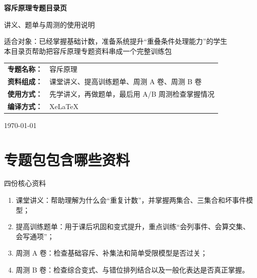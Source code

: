 \documentclass[11pt,a4paper,fontset=fandol]{ctexart}
\begin{document}
\thispagestyle{empty}
\begin{titlepage}
\centering
\vspace*{0.9cm}

\begin{tcolorbox}[
  enhanced,
  width=0.92\textwidth,
  colback=white,
  colframe=mainblue,
  boxrule=1pt,
  arc=0mm,
  left=6mm,
  right=6mm,
  top=8mm,
  bottom=8mm
]
\centering

{\fontsize{24}{30}\selectfont\bfseries 容斥原理专题目录页\par}
\vspace{0.65cm}
{\fontsize{17}{22}\selectfont 讲义、题单与周测的使用说明\par}

\vspace{1cm}
\begin{tcolorbox}[colback=lightblue,colframe=mainblue,width=0.84\textwidth,boxrule=1pt]
\centering
{\large 适合对象：已经掌握基础计数，准备系统提升“重叠条件处理能力”的学生}\\[0.35em]
{\normalsize 本目录页帮助把容斥原理专题资料串成一个完整训练包}
\end{tcolorbox}

\vspace{1.0cm}
\renewcommand{\arraystretch}{1.42}
\begin{tabular}{>{\bfseries}p{3.5cm}p{8cm}}
专题名称： & 容斥原理 \\
资料组成： & 课堂讲义、提高训练题单、周测 A 卷、周测 B 卷 \\
使用方式： & 先学讲义，再做题单，最后用 A/B 周测检查掌握情况 \\
编译方式： & XeLaTeX \\
\end{tabular}

\vspace{0.9cm}
{\large \today\par}
\end{tcolorbox}
\end{titlepage}

\tableofcontents
\newpage

\section{专题包包含哪些资料}

\begin{goalbox}{四份核心资料}
\begin{enumerate}
  \item 课堂讲义：帮助理解为什么会“重复计数”，并掌握两集合、三集合和坏事件模型；
  \item 提高训练题单：用于课后巩固和变式提升，重点训练“会列事件、会算交集、会写通项”；
  \item 周测 A 卷：检查基础容斥、补集法和简单受限模型是否过关；
  \item 周测 B 卷：检查综合变式、与错位排列结合以及一般化表达是否真正掌握。
\end{enumerate}
\end{goalbox}
\end{document}
